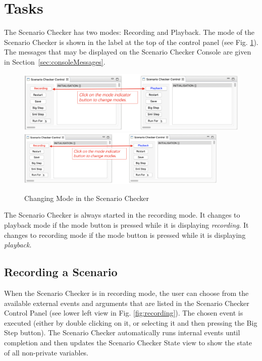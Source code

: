 \section{Tasks}
\label{sec:tasks}

The Scenario Checker has two modes: Recording and Playback. 
The mode of the Scenario Checker is shown in the label at the top of the control panel (see Fig. \ref{fig:changingMode}).
The messages that may be displayed on the Scenario Checker Console are given in Section~\ref{sec:consoleMessages}.

\begin{figure}[!htbp]
	\centering
	\ifplastex
	\includegraphics[width=768]{figures/changingMode}
	\else
	\includegraphics[width=0.9\textwidth]{figures/changingMode}
	\fi
	\caption{Changing Mode in the Scenario Checker}
	\label{fig:changingMode}
\end{figure}


The Scenario Checker is always started in the recording mode.
It changes to playback mode if the mode button is pressed while it is displaying \emph{recording}.
It changes to recording mode if the mode button is pressed while it is displaying \emph{playback}.

\subsection{Recording a Scenario}
\label{sec:recording}

When the Scenario Checker is in recording mode, the user can choose from the available external events and arguments that are listed in the Scenario Checker Control Panel (see lower left view in Fig. \ref{fig:recording}). 
The chosen  event is executed (either by double clicking on it, or selecting it and then pressing the Big Step button).
The Scenario Checker automatically runs internal events until completion and then updates the Scenario Checker State view to show the state of all non-private variables.

